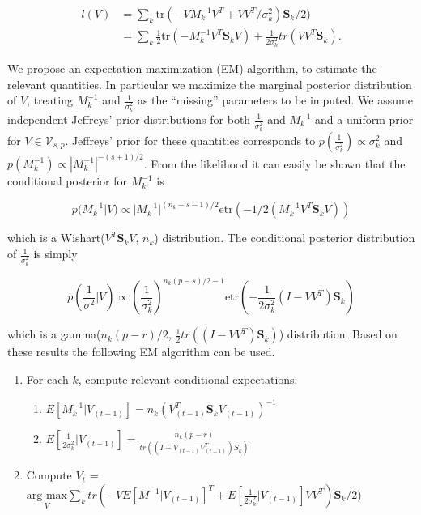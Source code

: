 \documentclass[12pt]{article}
\newcommand{\tr}{\text{tr}}
\newcommand{\etr}{\text{etr}}
\begin{document}
\begin{align}
\nonumber l(V) &= \sum_k \tr\left(-VM_k^{-1}V^T +
       VV^T/\sigma^2_k\right)\mathbf{S}_k/2)\\
&= \sum_k \frac{1}{2}\tr\left(-M_k^{-1}V^T \mathbf{S}_kV\right) + \frac{1}{2\sigma_k^2}tr\left(VV^T \mathbf{S}_k\right).
\end{align}


We propose an expectation-maximization (EM) algorithm, to estimate the
relevant quantities.  In particular we maximize the marginal posterior
distribution of $V$, treating $M_k^{-1}$ and $\frac{1}{\sigma_k^2}$ as
the ``missing'' parameters to be imputed.  We assume independent
Jeffreys' prior distributions for both $\frac{1}{\sigma_k^2}$ and
$M_k^{-1}$ and a uniform prior for $V \in \mathcal{V}_{s, p}$.
Jeffreys' prior for these quantities corresponds to
$p(\frac{1}{\sigma_k^2}) \propto \sigma_k^2$ and
$p(M_k^{-1}) \propto |M_k^{-1}|^{-(s+1)/2}$.  From the likelihood it
can easily be shown that the conditional posterior for $M_k^{-1}$ is

$$p(M_k^{-1} | V) \propto |M_k^{-1}|^{(n_k - s -1)/2}\etr(-1/2(M_k^{-1}V^T\mathbf{S}_kV)) $$

\noindent which is a Wishart($V^T\mathbf{S}_kV$, $n_k$) distribution.  The
conditional posterior distribution of $\frac{1}{\sigma_k^2}$ is simply

$$p\left(\frac{1}{\sigma^2} | V\right) \propto \left(\frac{1}{\sigma_k^2}\right)^{n_k(p-s)/2-1}\etr\left(-\frac{1}{2\sigma^2_k} (I-VV^T)\mathbf{S}_k\right)  $$

\noindent which is a gamma($n_k(p-r)/2$,
$\frac{1}{2}tr((I-VV^T)\mathbf{S}_k)$) distribution.  Based on these
results the following EM algorithm can be used.

\begin{enumerate}
\item For each $k$, compute relevant conditional expectations:
\begin{enumerate}
\item $E[M_k^{-1} | V_{(t-1)}] = n_k(V_{(t-1)}^T \mathbf{S}_kV_{(t-1)})^{-1}$
\item $E[\frac{1}{2\sigma_k^2}|V_{(t-1)}] = \frac{n_k(p-r)}{tr((I-V_{(t-1)}V_{(t-1)}^T)S_k)}$
\end{enumerate}
\item Compute $V_{t}$ = $\underset{V}{\text{arg } \text{max}}  \sum_k tr\left(-VE[M^{-1}|V_{(t-1)}]^T +
       E[\frac{1}{2\sigma_k^2}|V_{(t-1)}]VV^T\right)\mathbf{S}_k/2)$ 
\end{enumerate}
\end{document}
